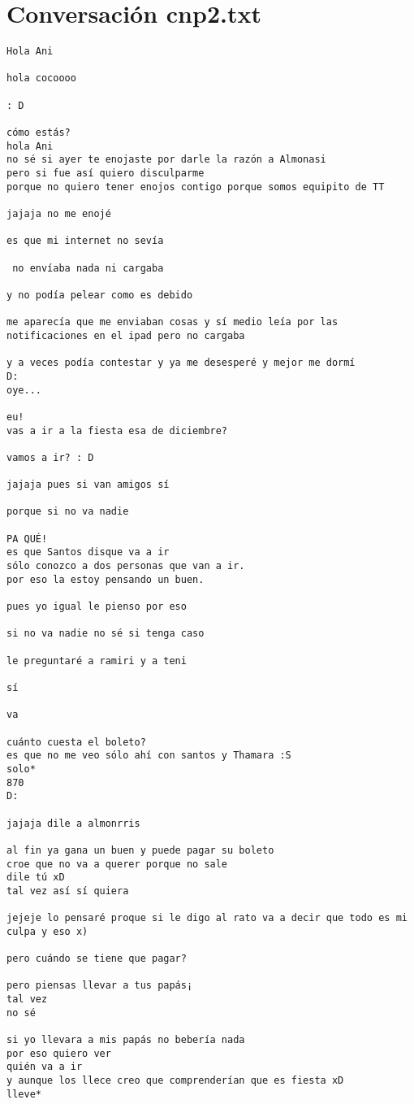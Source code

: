\section{Conversaci\'on cnp2.txt}
\begin{verbatim}
Hola Ani

hola cocoooo

: D

cómo estás? 
hola Ani
no sé si ayer te enojaste por darle la razón a Almonasi 
pero si fue así quiero disculparme
porque no quiero tener enojos contigo porque somos equipito de TT 

jajaja no me enojé

es que mi internet no sevía

 no envíaba nada ni cargaba

y no podía pelear como es debido

me aparecía que me enviaban cosas y sí medio leía por las notificaciones en el ipad pero no cargaba 

y a veces podía contestar y ya me desesperé y mejor me dormí
D:
oye...

eu!
vas a ir a la fiesta esa de diciembre?

vamos a ir? : D

jajaja pues si van amigos sí

porque si no va nadie

PA QUÉ!
es que Santos disque va a ir
sólo conozco a dos personas que van a ir.
por eso la estoy pensando un buen.

pues yo igual le pienso por eso

si no va nadie no sé si tenga caso

le preguntaré a ramiri y a teni

sí 

va

cuánto cuesta el boleto?
es que no me veo sólo ahí con santos y Thamara :S
solo*
870
D:

jajaja dile a almonrris

al fin ya gana un buen y puede pagar su boleto 
croe que no va a querer porque no sale
dile tú xD
tal vez así sí quiera

jejeje lo pensaré proque si le digo al rato va a decir que todo es mi culpa y eso x)

pero cuándo se tiene que pagar?

pero piensas llevar a tus papás¡
tal vez
no sé

si yo llevara a mis papás no bebería nada 
por eso quiero ver 
quién va a ir
y aunque los llece creo que comprenderían que es fiesta xD
lleve*


\end{verbatim}
